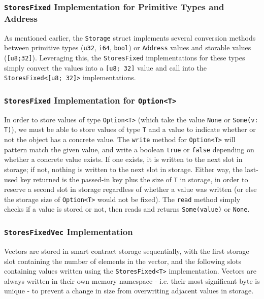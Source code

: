 \subsubsection{\texttt{StoresFixed} Implementation for Primitive Types and Address}

As mentioned earlier, the \texttt{Storage} struct implements several conversion methods between primitive types (\texttt{u32}, \texttt{i64}, \texttt{bool}) or \texttt{Address} values and storable values (\texttt{[u8;32]}). Leveraging this, the \texttt{StoresFixed} implementations for these types simply convert the values into a \texttt{[u8; 32]} value and call into the \texttt{StoresFixed<[u8; 32]>} implementations.


\subsubsection{\texttt{StoresFixed} Implementation for \texttt{Option<T>}}

In order to store values of type \texttt{Option<T>} (which take the value \texttt{None} or \texttt{Some(v: T)}), we must be able to store values of type \texttt{T} and a value to indicate whether or not the object has a concrete value. The \texttt{write} method for \texttt{Option<T>} will pattern match the given value, and write a boolean \texttt{true} or \texttt{false} depending on whether a concrete value exists. If one exists, it is written to the next slot in storage; if not, nothing is written to the next slot in storage. Either way, the last-used key returned is the passed-in key plus the size of \texttt{T} in storage, in order to reserve a second slot in storage regardless of whether a value was written (or else the storage size of \texttt{Option<T>} would not be fixed). The \texttt{read} method simply checks if a value is stored or not, then reads and returns \texttt{Some(value)} or \texttt{None}.


\subsubsection{\texttt{StoresFixedVec} Implementation}

Vectors are stored in smart contract storage sequentially, with the first storage slot containing the number of elements in the vector, and the following slots containing values written using the \texttt{StoresFixed<T>} implementation. Vectors are always written in their own memory namespace - i.e. their most-significant byte is unique - to prevent a change in size from overwriting adjacent values in storage. \\

